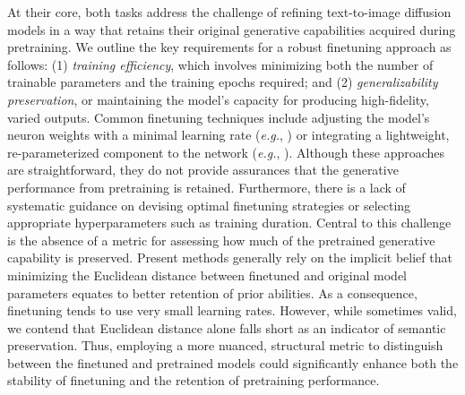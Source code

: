 At their core, both tasks address the challenge of refining text-to-image diffusion models in a way that retains their original generative capabilities acquired during pretraining. We outline the key requirements for a robust finetuning approach as follows: (1) \emph{training efficiency}, which involves minimizing both the number of trainable parameters and the training epochs required; and (2) \emph{generalizability preservation}, or maintaining the model's capacity for producing high-fidelity, varied outputs. Common finetuning techniques include adjusting the model’s neuron weights with a minimal learning rate (\emph{e.g.}, \cite{ruiz2023dreambooth}) or integrating a lightweight, re-parameterized component to the network (\emph{e.g.}, \cite{hulora2022,zhang2023adding}). Although these approaches are straightforward, they do not provide assurances that the generative performance from pretraining is retained. Furthermore, there is a lack of systematic guidance on devising optimal finetuning strategies or selecting appropriate hyperparameters such as training duration. Central to this challenge is the absence of a metric for assessing how much of the pretrained generative capability is preserved. Present methods generally rely on the implicit belief that minimizing the Euclidean distance between finetuned and original model parameters equates to better retention of prior abilities. As a consequence, finetuning tends to use very small learning rates. However, while sometimes valid, we contend that Euclidean distance alone falls short as an indicator of semantic preservation. Thus, employing a more nuanced, structural metric to distinguish between the finetuned and pretrained models could significantly enhance both the stability of finetuning and the retention of pretraining performance.

